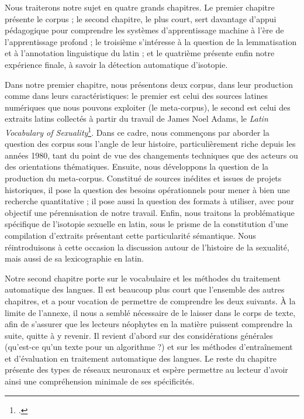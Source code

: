 Nous traiterons notre sujet en quatre grands chapitres. Le premier chapitre présente le corpus ; le second chapitre, le plus court, sert davantage d'appui pédagogique pour comprendre les systèmes d'apprentissage machine à l'ère de l'apprentissage profond ; le troisième s'intéresse à la question de la lemmatisation et à l'annotation linguistique du latin ; et le quatrième présente enfin notre expérience finale, à savoir la détection automatique d'isotopie.

Dans notre premier chapitre, nous présentons deux corpus, dans leur production comme dans leurs caractéristiques: le premier est celui des sources latines numériques que nous pouvons exploiter (le meta-corpus), le second est celui des extraits latins collectés à partir du travail de James Noel Adams, le \textit{Latin Vocabulary of Sexuality}\footcite{adams}. Dans ce cadre, nous commençons par aborder la question des corpus sous l'angle de leur histoire, particulièrement riche depuis les années 1980, tant du point de vue des changements techniques que des acteurs ou des orientations thématiques. Ensuite, nous développons la question de la production du meta-corpus. Constitué de sources inédites et issues de projets historiques, il pose la question des besoins opérationnels pour mener à bien une recherche quantitative ; il pose aussi la question des formats à utiliser, avec pour objectif une pérennisation de notre travail. Enfin, nous traitons la problématique spécifique de l'isotopie sexuelle en latin, sous le prisme de la constitution d'une compilation d'extraits présentant cette particularité sémantique. Nous réintroduisons à cette occasion la discussion autour de l'histoire de la sexualité, mais aussi de sa lexicographie en latin.


Notre second chapitre porte sur le vocabulaire et les méthodes du traitement automatique des langues. Il est beaucoup plus court que l'ensemble des autres chapitres, et a pour vocation de permettre de comprendre les deux suivants. À la limite de l'annexe, il nous a semblé nécessaire de le laisser dans le corps de texte, afin de s'assurer que les lecteurs néophytes en la matière puissent comprendre la suite, quitte à y revenir. Il revient d'abord sur des considérations générales (qu'est-ce qu'un texte pour un algorithme ?) et sur les méthodes d'entraînement et d'évaluation en traitement automatique des langues. Le reste du chapitre présente des types de réseaux neuronaux et espère permettre au lecteur d'avoir ainsi une compréhension minimale de ses spécificités.

